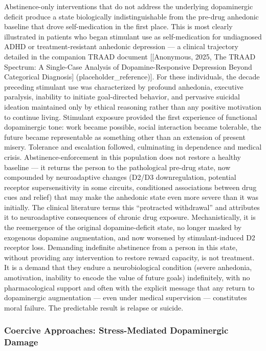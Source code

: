 Abstinence-only interventions that do not address the underlying dopaminergic deficit produce a state biologically indistinguishable from the pre-drug anhedonic baseline that drove self-medication in the first place. This is most clearly illustrated in patients who began stimulant use as self-medication for undiagnosed ADHD or treatment-resistant anhedonic depression --- a clinical trajectory detailed in the companion TRAAD document {[}{[}Anonymous, 2025, The TRAAD Spectrum: A Single-Case Analysis of Dopamine-Responsive Depression Beyond Categorical Diagnosis{]} (placeholder\_reference){]}. For these individuals, the decade preceding stimulant use was characterized by profound anhedonia, executive paralysis, inability to initiate goal-directed behavior, and pervasive suicidal ideation maintained only by ethical reasoning rather than any positive motivation to continue living. Stimulant exposure provided the first experience of functional dopaminergic tone: work became possible, social interaction became tolerable, the future became representable as something other than an extension of present misery. Tolerance and escalation followed, culminating in dependence and medical crisis. Abstinence-enforcement in this population does not restore a healthy baseline --- it returns the person to the pathological pre-drug state, now compounded by neuroadaptive changes (D2/D3 downregulation, potential receptor supersensitivity in some circuits, conditioned associations between drug cues and relief) that may make the anhedonic state even more severe than it was initially. The clinical literature terms this ``protracted withdrawal'' and attributes it to neuroadaptive consequences of chronic drug exposure. Mechanistically, it is the reemergence of the original dopamine-deficit state, no longer masked by exogenous dopamine augmentation, and now worsened by stimulant-induced D2 receptor loss. Demanding indefinite abstinence from a person in this state, without providing any intervention to restore reward capacity, is not treatment. It is a demand that they endure a neurobiological condition (severe anhedonia, amotivation, inability to encode the value of future goals) indefinitely, with no pharmacological support and often with the explicit message that any return to dopaminergic augmentation --- even under medical supervision --- constitutes moral failure. The predictable result is relapse or suicide.

\subsubsection{Coercive Approaches: Stress-Mediated Dopaminergic Damage}\label{18_restoration-coercive-approaches-stress-mediated-dopaminergic-damage}

